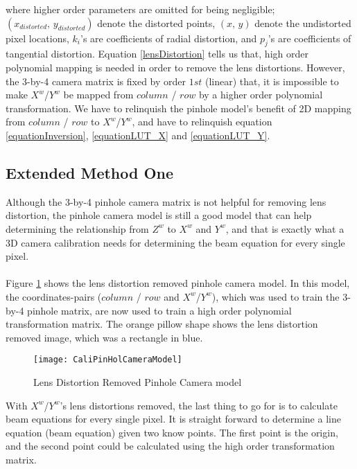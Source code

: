 %
where higher order parameters are omitted for being negligible; \((x_{distorted}, \, y_{distorted})\) denote the distorted points, \((x, \, y)\) denote the undistorted pixel locations, \(k_i\)'s are coefficients of radial distortion, and \(p_j\)'s are coefficients of tangential distortion.%
%
%
Equation \ref{lensDistortion} tells us that, high order polynomial mapping is needed in order to remove the lens distortions. However, the 3-by-4 camera matrix is fixed by order \(1st\) (linear) that, it is impossible to make \(X^w\)/\(Y^w\) be mapped from \(column\) / \(row\) by a higher order polynomial transformation. We have to relinquish the pinhole model's benefit of 2D mapping from \(column\) / \(row\) to \(X^w\)/\(Y^w\), and have to relinquish equation  \ref{equationInversion}, \ref{equationLUT_X} and \ref{equationLUT_Y}.%
%
\subsection{Extended Method One}
Although the 3-by-4 pinhole camera matrix is not helpful for removing lens distortion, the pinhole camera model is still a good model that can help determining the relationship from \(Z^w\) to \(X^w\) and \(Y^w\), and that is exactly what a 3D camera calibration needs for determining the beam equation for every single pixel.%
\\\\%
Figure \ref{CaliPinHolCameraModel} shows the lens distortion removed pinhole camera model. In this model, the coordinates-pairs (\(column\) / \(row\) and \(X^w\)/\(Y^w\)), which was used to train the 3-by-4 pinhole matrix, are now used to train a high order polynomial transformation matrix. The orange pillow shape shows the lens distortion removed image, which was a rectangle in blue.
%
\begin{figure}[H]
\centering
\texttt{[image: CaliPinHolCameraModel]}
\caption{Lens Distortion Removed Pinhole Camera model}
\label{CaliPinHolCameraModel}
\end{figure}%
%
\noindent
With \(X^w\)/\(Y^w\)'s lens distortions removed, the last thing to go for is to calculate beam equations for every single pixel. It is straight forward to determine a line equation (beam equation) given two know points. The first point is the origin, and the second point could be calculated using the high order transformation matrix.
